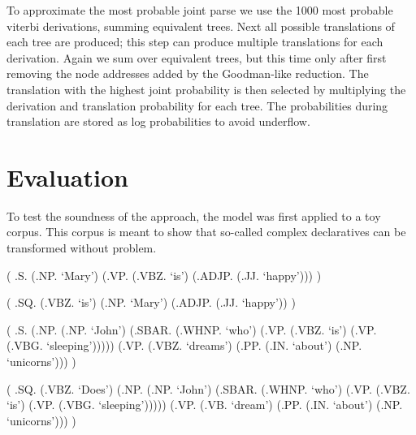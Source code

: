 \documentclass[a4paper]{article}
\theoremstyle{definition}
\begin{document}
To approximate the most probable joint parse we use the 1000 most probable
viterbi derivations, summing equivalent trees. Next all possible translations
of each tree are produced; this step can produce multiple translations for each
derivation. Again we sum over equivalent trees, but this time only
after first removing the node addresses added by the Goodman-like reduction.
The translation with the highest joint probability is then selected by
multiplying the derivation and translation probability for each tree. The
probabilities during translation are stored as log probabilities to avoid
underflow.

\label{sec:implem}

\section{Evaluation}
\label{sec:eval}

%

To test the soundness of the approach, the model was first applied to a toy
corpus. This corpus is meant to show that so-called complex declaratives can be
transformed without problem.

\begin{center}
\begin{parsetree}
( .S.
    (.NP. `Mary')
    (.VP. (.VBZ. `is')
	(.ADJP. (.JJ. `happy')))
)
\end{parsetree}
\begin{parsetree}
( .SQ.
    (.VBZ. `is')
    (.NP. `Mary')
    (.ADJP. (.JJ. `happy'))
)
\end{parsetree}
\end{center}

\begin{parsetree}
\pthorgap{2pt}
\ptvergap{4pt}
( .S.
	(.NP. (.NP. `John')
		(.SBAR. 
			(.WHNP. `who')
			(.VP. (.VBZ. `is') (.VP. (.VBG. `sleeping')))))
	(.VP. (.VBZ. `dreams') (.PP. (.IN. `about') (.NP. `unicorns')))
)
\end{parsetree}

\begin{parsetree}
\pthorgap{2pt}
\ptvergap{4pt}
( .SQ.
	(.VBZ. `Does')
	(.NP. (.NP. `John')
		(.SBAR. (.WHNP. `who')
			(.VP. (.VBZ. `is') (.VP. (.VBG. `sleeping')))))
	(.VP. (.VB. `dream') (.PP. (.IN. `about') (.NP. `unicorns')))
)
\end{parsetree}
\\
\end{document}
